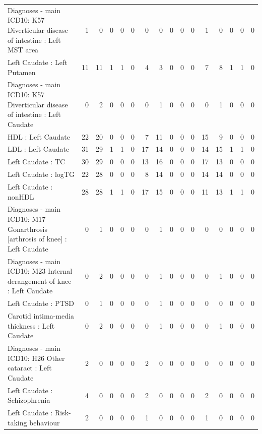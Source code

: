 \begin{table}[ht]
\begin{tabular}{lrrrrrrrrrrrrrrr}
  Diagnoses - main ICD10: K57 Diverticular disease of intestine : Left MST area &   1 &   0 &   0 &   0 &   0 &   0 &   0 &   0 &   0 &   0 &   1 &   0 &   0 &   0 &   0 \\ 
  Left Caudate : Left Putamen &  11 &  11 &   1 &   1 &   0 &   4 &   3 &   0 &   0 &   0 &   7 &   8 &   1 &   1 &   0 \\ 
  Diagnoses - main ICD10: K57 Diverticular disease of intestine : Left Caudate &   0 &   2 &   0 &   0 &   0 &   0 &   1 &   0 &   0 &   0 &   0 &   1 &   0 &   0 &   0 \\ 
  HDL : Left Caudate &  22 &  20 &   0 &   0 &   0 &   7 &  11 &   0 &   0 &   0 &  15 &   9 &   0 &   0 &   0 \\ 
  LDL : Left Caudate &  31 &  29 &   1 &   1 &   0 &  17 &  14 &   0 &   0 &   0 &  14 &  15 &   1 &   1 &   0 \\ 
  Left Caudate : TC &  30 &  29 &   0 &   0 &   0 &  13 &  16 &   0 &   0 &   0 &  17 &  13 &   0 &   0 &   0 \\ 
  Left Caudate : logTG &  22 &  28 &   0 &   0 &   0 &   8 &  14 &   0 &   0 &   0 &  14 &  14 &   0 &   0 &   0 \\ 
  Left Caudate : nonHDL &  28 &  28 &   1 &   1 &   0 &  17 &  15 &   0 &   0 &   0 &  11 &  13 &   1 &   1 &   0 \\ 
  Diagnoses - main ICD10: M17 Gonarthrosis [arthrosis of knee] : Left Caudate &   0 &   1 &   0 &   0 &   0 &   0 &   1 &   0 &   0 &   0 &   0 &   0 &   0 &   0 &   0 \\ 
  Diagnoses - main ICD10: M23 Internal derangement of knee : Left Caudate &   0 &   2 &   0 &   0 &   0 &   0 &   1 &   0 &   0 &   0 &   0 &   1 &   0 &   0 &   0 \\ 
  Left Caudate : PTSD &   0 &   1 &   0 &   0 &   0 &   0 &   1 &   0 &   0 &   0 &   0 &   0 &   0 &   0 &   0 \\ 
  Carotid intima-media thickness : Left Caudate &   0 &   2 &   0 &   0 &   0 &   0 &   1 &   0 &   0 &   0 &   0 &   1 &   0 &   0 &   0 \\ 
  Diagnoses - main ICD10: H26 Other cataract : Left Caudate &   2 &   0 &   0 &   0 &   0 &   2 &   0 &   0 &   0 &   0 &   0 &   0 &   0 &   0 &   0 \\ 
  Left Caudate : Schizophrenia &   4 &   0 &   0 &   0 &   0 &   2 &   0 &   0 &   0 &   0 &   2 &   0 &   0 &   0 &   0 \\ 
  Left Caudate : Risk-taking behaviour &   2 &   0 &   0 &   0 &   0 &   1 &   0 &   0 &   0 &   0 &   1 &   0 &   0 &   0 &   0 \\ 

\end{tabular}
\end{table}
